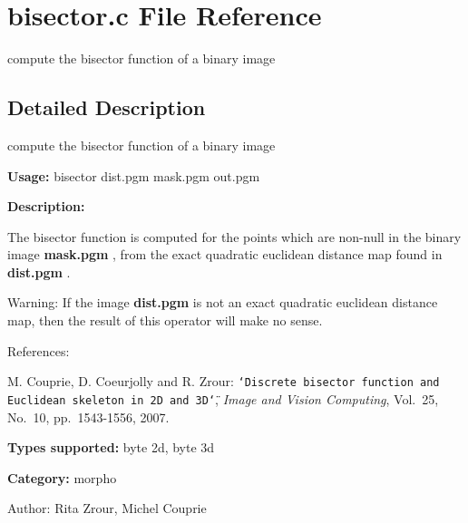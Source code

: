 \section{bisector.c File Reference}
\label{bisector_8c}
compute the bisector function of a binary image 



\subsection{Detailed Description}
compute the bisector function of a binary image 

{\bf Usage:} bisector dist.pgm mask.pgm out.pgm

{\bf Description:}

The bisector function is computed for the points which are non-null in the binary image {\bf mask.pgm} , from the exact quadratic euclidean distance map found in {\bf dist.pgm} .

\begin{Desc}
\item[Warning:]If the image {\bf dist.pgm} is not an exact quadratic euclidean distance map, then the result of this operator will make no sense.\end{Desc}
References:\par
 [CCZ07] M. Couprie, D. Coeurjolly and R. Zrour: {\tt \char`\"{}Discrete bisector function and Euclidean skeleton in 2D and 3D\char`\"{}}, {\em Image and Vision Computing\/}, Vol.~25, No.~10, pp.~1543-1556, 2007.\par


{\bf Types supported:} byte 2d, byte 3d

{\bf Category:} morpho

\begin{Desc}
\item[Author:]Rita Zrour, Michel Couprie \end{Desc}
